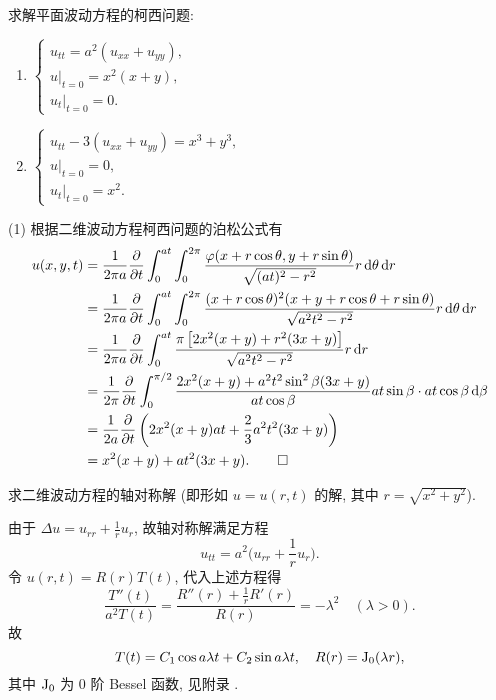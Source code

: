 \begin{exercise}
  求解平面波动方程的柯西问题:
  \begin{enumerate}[(1)]
    \item $\begin{cases}
            u_{tt} = a^2(u_{xx}+u_{yy}), \\
            u|_{t=0}=x^2(x+y), \\
            u_t|_{t=0}=0.
          \end{cases}$
    \item $\begin{cases}
            u_{tt} - 3(u_{xx}+u_{yy}) = x^3+y^3, \\
            u|_{t=0}=0, \\
            u_t|_{t=0}=x^2.
          \end{cases}$
  \end{enumerate}
\end{exercise}

\begin{solve}
  (1) 根据二维波动方程柯西问题的泊松公式有
  \begin{align*}
    u(x,y,t)
    & = \frac{1}{2\pi a}\frac{\partial}{\partial t}\int_0^{at}\int_0^{2\pi}\frac{\varphi(x         
      + r\cos\theta,y+r\sin\theta)}{\sqrt{(at)^2-r^2}}r\mathop{}\!\mathrm{d}\theta\mathop{}\!\mathrm{d} r \\
    & = \frac{1}{2\pi a}\frac{\partial}{\partial t}\int_0^{at}
      \int_0^{2\pi}\frac{(x+r\cos\theta)^2
      (x+y+r\cos\theta+r\sin\theta)}{\sqrt{a^2t^2-r^2}}r\mathop{}\!\mathrm{d}\theta\mathop{}\!\mathrm{d} r \\
    & = \frac{1}{2\pi a}\frac{\partial}{\partial t}
      \int_0^{at}\frac{\pi\left[2x^2(x+y)+r^2(3x+y)\right]}{\sqrt{a^2t^2-r^2}}r\mathop{}\!\mathrm{d} r \\
    & = \frac{1}{2\pi}\frac{\partial}{\partial t}\int_0^{\pi/2}
      \frac{2x^2(x+y)+a^2t^2\sin^2\beta(3x+y)}{at\cos\beta}
      at\sin\beta\cdot at\cos\beta \mathop{}\!\mathrm{d}\beta \\
    & = \frac{1}{2a}\frac{\partial}{\partial t}\left(2x^2(x+y)at+\frac{2}{3}a^2t^2(3x+y)\right)\\
    & = x^2(x+y)+at^2(3x+y).\qedhere
  \end{align*}
\end{solve}


\begin{exercise}
  求二维波动方程的轴对称解 (即形如 $u=u(r,t)$ 的解, 其中 $r=\sqrt{x^2+y^2}$).
\end{exercise}

\begin{solve}
  由于 $\Delta u = u_{rr} + \frac{1}{r}u_r$, 故轴对称解满足方程
  \[u_{tt} = a^2\biggl(u_{rr}+\frac{1}{r}u_r\biggr).\]
  令 $u(r,t) = R(r)T(t)$, 代入上述方程得
  \[\frac{T''(t)}{a^2T(t)} = \frac{R''(r)+\frac{1}{r}R'(r)}{R(r)} = -\lambda^2
    \quad (\lambda>0).\]
  故
  \[T(t) = C_1\cos a\lambda t + C_2\sin a\lambda t,
    \quad R(r) = {\rm J}_0(\lambda r),\]
  其中 ${\rm J}_0$ 为 0 阶 Bessel 函数, 见附录 \uppercase\expandafter{}.
\end{solve}



